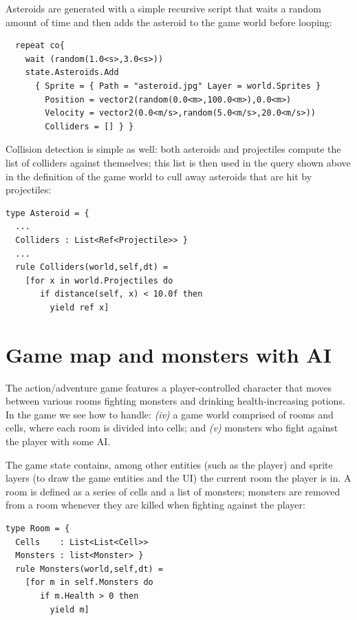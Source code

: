 Asteroids are generated with a simple recursive script that waits a random amount of time and then adds the asteroid to the game world before looping:

\begin{lstlisting}
  repeat co{ 
    wait (random(1.0<s>,3.0<s>)) 
    state.Asteroids.Add 
      { Sprite = { Path = "asteroid.jpg" Layer = world.Sprites }
        Position = vector2(random(0.0<m>,100.0<m>),0.0<m>) 
        Velocity = vector2(0.0<m/s>,random(5.0<m/s>,20.0<m/s>))
        Colliders = [] } } 
\end{lstlisting}

Collision detection is simple as well: both asteroids and projectiles compute the list of colliders against themselves; this list is then used in the query shown above in the definition of the game world to cull away asteroids that are hit by projectiles:

\begin{lstlisting}
type Asteroid = { 
  ...
  Colliders : List<Ref<Projectile>> } 
  ...
  rule Colliders(world,self,dt) = 
    [for x in world.Projectiles do
       if distance(self, x) < 10.0f then
         yield ref x] 
\end{lstlisting}

\section{Game map and monsters with AI}
The action/adventure game features a player-controlled character that moves between various rooms fighting monsters and drinking health-increasing potions. In the game we see how to handle: \textit{(iv)} a game world comprised of rooms and cells, where each room is divided into cells; and \textit{(v)} monsters who fight against the player with some AI. 

The game state contains, among other entities (such as the player) and sprite layers (to draw the game entities and the UI) the current room the player is in. A room is defined as a series of cells and a list of monsters; monsters are removed from a room whenever they are killed when fighting against the player:

\begin{lstlisting}
type Room = { 
  Cells    : List<List<Cell>> 
  Monsters : list<Monster> } 
  rule Monsters(world,self,dt) = 
    [for m in self.Monsters do 
       if m.Health > 0 then
         yield m]
\end{lstlisting}

